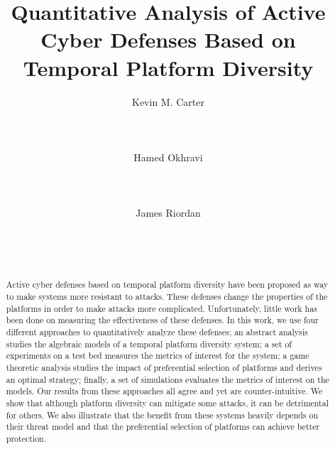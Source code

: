 \documentclass{acm_proc_article-sp}
\begin{document}
\title{Quantitative Analysis of Active Cyber Defenses Based on Temporal Platform Diversity}


\author{
\alignauthor
Kevin M. Carter\\
       \\
       \\
       \\
\alignauthor
Hamed Okhravi\\
       \\
       \\
       \\
\alignauthor James Riordan\\
       \\
       \\
       \\
}


\maketitle
\begin{abstract}
Active cyber defenses based on temporal platform diversity have been proposed 
as way to make systems more resistant to attacks. These defenses change the properties of the 
platforms in order to make attacks more complicated. Unfortunately, little work has been done 
on measuring the effectiveness of these defenses. In this work, we use four different approaches to 
quantitatively analyze these defenses; an abstract analysis studies the algebraic models of 
a temporal platform diversity system; a set of experiments on a test bed
measures the metrics of interest for the system; a game theoretic analysis 
studies the impact of preferential selection of platforms and derives an optimal strategy; 
finally, a set of simulations evaluates the metrics of interest on the models. Our results from 
these approaches all agree and yet are counter-intuitive. We show that although platform diversity can mitigate some attacks, it can be detrimental for others. We also illustrate that the benefit from these systems 
heavily depends on their threat model and that the preferential selection of platforms can achieve better protection.

\end{abstract}
\end{document}
